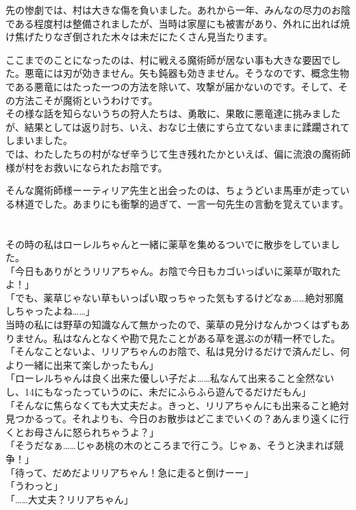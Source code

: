 \documentclass[oneside, a4paper]{jsbook}
\begin{document}
先の惨劇では、村は大きな傷を負いました。あれから一年、みんなの尽力のお陰である程度村は整備されましたが、当時は家屋にも被害があり、外れに出れば焼け焦げたりなぎ倒された木々は未だにたくさん見当たります。

ここまでのことになったのは、村に戦える魔術師が居ない事も大きな要因でした。悪竜には刃が効きません。矢も鈍器も効きません。そうなのです、概念生物である悪竜にはたった一つの方法を除いて、攻撃が届かないのです。そして、その方法こそが魔術というわけです。\\

その様な話を知らないうちの狩人たちは、勇敢に、果敢に悪竜達に挑みましたが、結果としては返り討ち、いえ、おなじ土俵にすら立てないままに蹂躙されてしまいました。\\

では、わたしたちの村がなぜ辛うじて生き残れたかといえば、偏に流浪の魔術師様が村をお救いになられたお陰です。

そんな魔術師様ーーティリア先生と出会ったのは、ちょうどいま馬車が走っている林道でした。あまりにも衝撃的過ぎて、一言一句先生の言動を覚えています。\\\\\\

その時の私はローレルちゃんと一緒に薬草を集めるついでに散歩をしていました。\\

\noindent
「今日もありがとうリリアちゃん。お陰で今日もカゴいっぱいに薬草が取れたよ！」\\
「でも、薬草じゃない草もいっぱい取っちゃった気もするけどなぁ……絶対邪魔しちゃったよね……」\\

当時の私には野草の知識なんて無かったので、薬草の見分けなんかつくはずもありません。私はなんとなくや勘で見たことがある草を選ぶのが精一杯でした。\\

\noindent
「そんなことないよ、リリアちゃんのお陰で、私は見分けるだけで済んだし、何より一緒に出来て楽しかったもん」\\
「ローレルちゃんは良く出来た優しい子だよ……私なんて出来ること全然ないし、14にもなったっていうのに、未だにふらふら遊んでるだけだもん」\\
「そんなに焦らなくても大丈夫だよ。きっと、リリアちゃんにも出来ること絶対見つかるって。それよりも、今日のお散歩はどこまでいくの？あんまり遠くに行くとお母さんに怒られちゃうよ？」\\
「そうだなぁ……じゃあ桃の木のところまで行こう。じゃぁ、そうと決まれば競争！」\\
「待って、だめだよリリアちゃん！急に走ると倒けーー」\\
「うわっと」\\
「……大丈夫？リリアちゃん」\\
\end{document}

